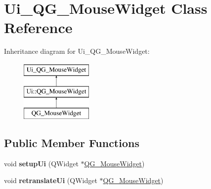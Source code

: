 \hypertarget{classUi__QG__MouseWidget}{\section{Ui\-\_\-\-Q\-G\-\_\-\-Mouse\-Widget Class Reference}
\label{classUi__QG__MouseWidget}
}
Inheritance diagram for Ui\-\_\-\-Q\-G\-\_\-\-Mouse\-Widget\-:\begin{figure}[H]
\begin{center}
\leavevmode
\includegraphics[height=3.000000cm]{classUi__QG__MouseWidget}
\end{center}
\end{figure}
\subsection*{Public Member Functions}
\begin{DoxyCompactItemize}
\item 
\hypertarget{classUi__QG__MouseWidget_aa003bc2d29d182c624648852642bbadd}{void {\bfseries setup\-Ui} (Q\-Widget $\ast$\hyperlink{classQG__MouseWidget}{Q\-G\-\_\-\-Mouse\-Widget})}\label{classUi__QG__MouseWidget_aa003bc2d29d182c624648852642bbadd}

\item 
\hypertarget{classUi__QG__MouseWidget_ae34b8b76a7d2b2f95a97a5467196abc2}{void {\bfseries retranslate\-Ui} (Q\-Widget $\ast$\hyperlink{classQG__MouseWidget}{Q\-G\-\_\-\-Mouse\-Widget})}\label{classUi__QG__MouseWidget_ae34b8b76a7d2b2f95a97a5467196abc2}

\end{DoxyCompactItemize}
